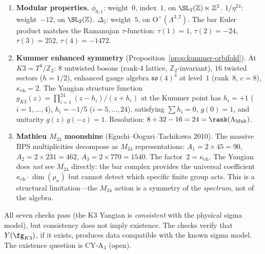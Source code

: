 \begin{enumerate}
\item \textbf{Modular properties.}
  $\phi_{0,1}$: weight~$0$, index~$1$, on $\SL_2(\mathbb{Z}) \ltimes
  \mathbb{Z}^2$.  $1/\eta^{24}$: weight~$-12$, on $\SL_2(\mathbb{Z})$.
  $\Delta_5$: weight~$5$, on $\mathrm{O}^+(\Lambda^{3,2})$.
  The bar Euler product matches the Ramanujan $\tau$-function:
  $\tau(1) = 1$, $\tau(2) = -24$, $\tau(3) = 252$, $\tau(4) = -1472$.

\item \textbf{Kummer enhanced symmetry} (Proposition~\ref{prop:kummer-orbifold}).
  At $K3 = T^4/\mathbb{Z}_2$: $8$ untwisted bosons (rank-$4$ lattice,
  $\mathbb{Z}_2$-invariant), $16$ twisted sectors ($h = 1/2$), enhanced
  gauge algebra $\mathfrak{so}(4)^4$ at level~$1$ (rank~$8$, $c = 8$),
  $\kappa_{\mathrm{ch}} = 2$.  The Yangian structure function
  $g_{K3}(z) = \prod_{i=1}^{24}(z - h_i)/(z + h_i)$ at the Kummer
  point has $h_i = +1$ ($i = 1, \ldots, 4$), $h_i = -1/5$
  ($i = 5, \ldots, 24$), satisfying $\sum h_i = 0$, $g(0) = 1$,
  and unitarity $g(z)\,g(-z) = 1$.  Resolution:
  $8 + 32 - 16 = 24 = \rank(\Lambda_{\mathrm{Muk}})$.

\item \textbf{Mathieu $M_{24}$ moonshine} (Eguchi--Ooguri--Tachikawa 2010).
  The massive BPS multiplicities decompose as $M_{24}$ representations:
  $A_1 = 2 \times 45 = 90$, $A_2 = 2 \times 231 = 462$,
  $A_3 = 2 \times 770 = 1540$.  The factor~$2 = \kappa_{\mathrm{ch}}$.
  The Yangian does \emph{not} see $M_{24}$ directly: the bar complex
  provides the universal coefficient $\kappa_{\mathrm{ch}} \cdot
  \dim(\rho_n)$ but cannot detect which specific finite group acts.
  This is a structural limitation---the $M_{24}$ action is a symmetry
  of the \emph{spectrum}, not of the algebra.
\end{enumerate}

\begin{remark}
\label{rem:sigma-model-consistency-caveat}
All seven checks pass (the K3 Yangian is \emph{consistent} with the
physical sigma model), but consistency does not imply existence.
The checks verify that $Y(\fg_{K3})$, if it exists, produces data
compatible with the known sigma model.  The existence question is
CY-A$_3$ (open).
\end{remark}


